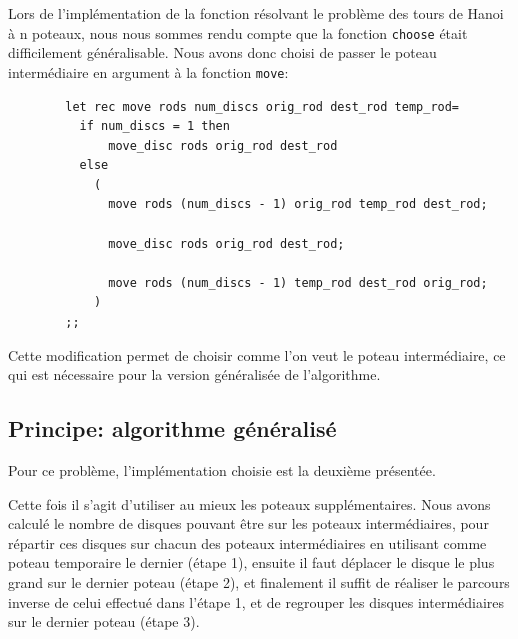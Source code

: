 \documentclass[a4paper, 11pt]{article}%
\begin{document}
		Lors de l'implémentation de la fonction résolvant le problème des tours
		de Hanoi à n poteaux, nous nous sommes rendu compte que la fonction
		\texttt{choose} était difficilement généralisable. Nous avons donc choisi
		de passer le poteau intermédiaire en argument à la fonction \texttt{move}:

		\begin{lstlisting}
		let rec move rods num_discs orig_rod dest_rod temp_rod=
		  if num_discs = 1 then
			  move_disc rods orig_rod dest_rod
		  else
			(
			  move rods (num_discs - 1) orig_rod temp_rod dest_rod;
			  
			  move_disc rods orig_rod dest_rod;
			  
			  move rods (num_discs - 1) temp_rod dest_rod orig_rod;
			)
		;;
		\end{lstlisting}

		Cette modification permet de choisir comme l'on veut le poteau intermédiaire,
		ce qui est nécessaire pour la version généralisée de l'algorithme.
	
	\subsection{Principe: algorithme généralisé}
		Pour ce problème, l'implémentation choisie est la deuxième présentée.
		
		Cette fois il s'agit d'utiliser au mieux les poteaux supplémentaires.
		Nous avons calculé le nombre de disques pouvant être sur les poteaux
		intermédiaires, pour répartir ces disques sur chacun des poteaux intermédiaires
		en utilisant comme poteau temporaire le dernier (étape 1), ensuite il faut
		déplacer le disque le plus grand sur le dernier poteau (étape 2), et finalement
		il suffit de réaliser le parcours inverse de celui effectué dans l'étape 1,
		et de regrouper les disques intermédiaires sur le dernier poteau (étape 3).
		
\end{document}
